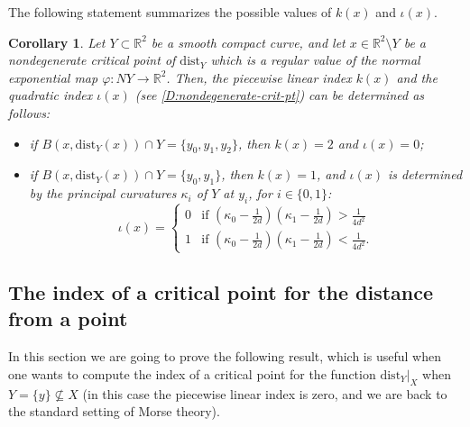 \documentclass{amsart}
\newcommand{\R}{\mathbb{R}}
\newcommand{\dd}{\mathrm{dist}}
\newcommand{\dist}{{\mathrm{dist}_Y|_X}}
\def\lini{k}
\def\quadi{\iota}
\newtheorem{corollary}[subsubsection]{Corollary}
\theoremstyle{definition}
\theoremstyle{remark}
\begin{document}
The following statement summarizes the possible values of $\lini (x)$ and $\quadi (x)$. 

\begin{corollary}\label{coro:indicesR2}
Let $Y\subset \R^2$ be a smooth compact curve, and let $x \in \mathbb{R}^2 \setminus Y$ be a nondegenerate critical point of $\dd_Y$ which is a regular value of the normal exponential map $\varphi: NY\to \R^2$. Then, the piecewise linear index $\lini(x)$ and the quadratic index $\quadi(x)$ (see \cref{D:nondegenerate-crit-pt}) can be determined as follows:
\begin{itemize}
    \item [-] if $B(x,\dd_Y(x))\cap Y =\{y_0,y_1,y_2\}$, then $\lini(x)=2$ and $\quadi(x)=0$;
    \item [-] if $B(x,\dd_Y(x))\cap Y =\{y_0,y_1\}$, then $\lini (x)=1$, and $\quadi (x)$ is determined by the principal curvatures $\kappa_i$ of $Y$ at $y_i$, for $i\in \{0,1\}$:
\[
\quadi (x) = \begin{cases}
  0  & \text{if } \left( \kappa_0 -\frac{1}{2d}\right)\left( \kappa_1 -\frac{1}{2d}\right) > \frac{1}{4d^2} \\
  1 & \text{if } \left( \kappa_0 -\frac{1}{2d}\right)\left( \kappa_1 -\frac{1}{2d}\right) < \frac{1}{4d^2} .
\end{cases}
\]
\end{itemize}
\end{corollary}














    






\subsection{The index of a critical point for the distance from a point}In this section we are going to prove the following result, which is useful when one wants to compute the index of a critical point for the function $\dist$ when $Y=\{y\}\not\subseteq X$ (in this case the piecewise linear index is zero, and we are back to the standard setting of Morse theory).
\end{document}

